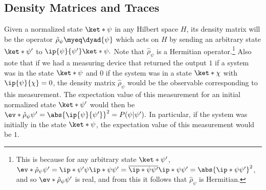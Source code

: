 \documentclass[12pt]{report}
\begin{document}
    \subsection{Density Matrices and Traces}
    Given a normalized state $\ket*{\psi}$ in any Hilbert space $H$,  
    its density matrix will be the operator $\hat{\rho}_\psi\myeq\dyad{\psi}$ %
%
    which  %
%
    acts on $H$ by sending an arbitrary state $\ket*{\psi'}$ to $\ip{\psi}{\psi'}\ket*{\psi}.$  Note that $\hat{\rho}_\psi$ is a Hermitian operator.\footnote{This is because for any arbitrary state $\ket*{\psi'}$, $\ev*{\hat{\rho}_\psi}{{\psi'}} = \ip*{\psi'}{\psi} \ip*{\psi}{\psi'}=\overline{\ip*{\psi}{\psi'}}\ip*{\psi}{\psi'}=\abs{\ip*{\psi}{\psi'}}^2$, and so $\ev*{\hat{\rho}_\psi}{{\psi'}}$ is real, and from this it follows that $\hat{\rho}_\psi$ is Hermitian. } Also note that if we had a measuring device that returned the output $1$ if a system was in the state $\ket*{\psi}$ and $0$ if the system was in a state $\ket*{\chi}$ with $\ip{\psi}{\chi}=0$, the density matrix $\hat{\rho}_\psi$ would be the observable corresponding to this measurement. The expectation value of this measurement for an initial normalized state $\ket*{\psi'}$ would then be $\ev*{\hat{\rho}_\psi}{\psi'}=\abs{\ip{\psi}{\psi'}}^2=P(\psi|\psi').$ In particular, if the system was initially in the state $\ket*{\psi}$, the expectation value of this measurement would be $1$.
    
\end{document}
